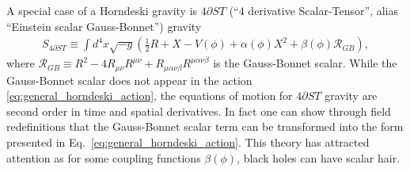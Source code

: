 \documentclass{ws-ijmpd}
\begin{document}
A special case of a Horndeski gravity is $4\partial ST$ 
(``4 derivative Scalar-Tensor'', alias
``Einstein scalar Gauss-Bonnet'') gravity
\begin{align}
   \label{eq:action_4dST_gravity}
   S_{4\partial ST}
   \equiv
   \int d^4x\sqrt{-g}\left(
      \frac{1}{2}R 
      + 
      X
      -
      V\left(\phi\right)
      +
      \alpha\left(\phi\right)X^2
      +
      \beta\left(\phi\right)\mathcal{R}_{GB}
   \right)
   ,
\end{align}
where 
$\mathcal{R}_{GB}
\equiv 
R^2 
- 
4R_{\mu\nu}R^{\mu\nu} 
+ 
R_{\mu\alpha\nu\beta}R^{\mu\alpha\nu\beta}$
is the Gauss-Bonnet scalar. While the Gauss-Bonnet scalar does
not appear in the action \eqref{eq:general_horndeski_action},
the equations of motion for $4\partial ST$ gravity are second order
in time and 
spatial derivatives\cite{Zwiebach:1985uq,Gross:1986mw,
Kovacs:2020pns,Kovacs:2020ywu}.
In fact one can show through field redefinitions that
the Gauss-Bonnet scalar term can be transformed into the 
form presented in 
Eq.~\eqref{eq:general_horndeski_action}\cite{Kobayashi:2011nu}.
This theory has attracted attention as for some coupling functions
$\beta\left(\phi\right)$, black holes can have 
scalar hair\cite{Kanti:1995vq,
Sotiriou:2013qea,
Sotiriou:2014pfa,
Sotiriou:2015pka,
Silva:2017uqg,
Doneva:2017bvd,
Minamitsuji:2018xde
}.
\end{document}
